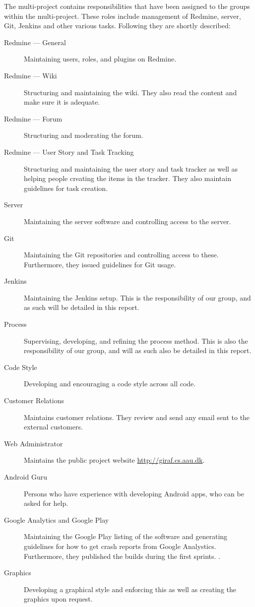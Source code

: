 The multi-project contains responsibilities that have been assigned to the groups within the multi-project. These roles include management of Redmine, server, Git, Jenkins and other various tasks. Following they are shortly described:

\begin{description}
  \item[Redmine --- General] Maintaining users, roles, and plugins on Redmine.
  \item[Redmine --- Wiki] Structuring and maintaining the wiki. They also read the content and make sure it is adequate.
  \item[Redmine --- Forum] Structuring and moderating the forum.
  \item[Redmine --- User Story and Task Tracking] Structuring and maintaining the user story and task tracker as well as helping people creating the items in the tracker. They also maintain guidelines for task creation.
  \item[Server] Maintaining the server software and controlling access to the server.
  \item[Git] Maintaining the Git repositories and controlling access to these. Furthermore, they issued guidelines for Git usage.
  \item[Jenkins] Maintaining the Jenkins setup. This is the responsibility of our group, and as such will be detailed in this report.
  \item[Process] Supervising, developing, and refining the process method. This is also the responsibility of our group, and will as such also be detailed in this report.
  \item[Code Style] Developing and encouraging a code style across all code.
  \item[Customer Relations] Maintains customer relations. They review and send any email sent to the external customers.
  \item[Web Administrator] Maintains the public project website \url{http://giraf.cs.aau.dk}.
  \item[Android Guru] Persons who have experience with developing Android apps, who can be asked for help.
  \item[Google Analytics and Google Play] Maintaining the Google Play listing of the software and generating guidelines for how to get crash reports from Google Analystics. Furthermore, they published the builds during the first sprints. .
  \item[Graphics] Developing a graphical style and enforcing this as well as creating the graphics upon request.
\end{description}

